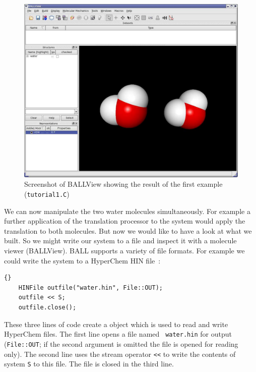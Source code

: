 \begin{figure}[t]
	\centering
	\includegraphics[width=\textwidth]{tut1_screenshot}
	\caption{Screenshot of BALLView showing the result of the first example
					 ({\tt tutorial1.C})}
	\label{fig:tut1-screenshot}
\end{figure}
\noindent
We can now manipulate the two water molecules simultaneously. For example a
further application of the translation processor to the system would apply
the translation to both molecules.
But now we would like to have a look at what we built. So we might write our
system to a file and inspect it with a molecule viewer (\eg BALLView).
BALL supports a variety of file formats. For example we could write the system
to a HyperChem HIN file~\cite{HyperChem}:
\begin{lstlisting}{}
	HINFile outfile("water.hin", File::OUT);
	outfile << S;
	outfile.close();
\end{lstlisting}
\noindent
These three lines of code create a  object which is used to
read and write HyperChem files. The first line opens a file named {\tt
water.hin} for output ({\tt File::OUT}; if the second argument is omitted the
file is opened for reading only).
The second line uses the stream operator {\tt <<} to write the contents
of system {\tt S} to this file. The file is closed in the third line.


